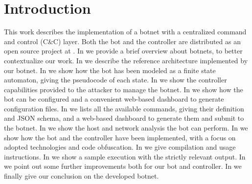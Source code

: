 \section{Introduction}
\label{sec:introduction}

This work describes the implementation of a botnet with a centralized command and control (C\&C) layer. Both the bot and the controller are distributed as an open source project at \cite{project-repo}.
In  we provide a brief overview about botnets, to better contextualize our work.
In  we describe the reference architecture implemented by our botnet.
In  we show how the bot has been modeled as a finite state automaton, giving the pseudocode of each state.
In  we show the controller capabilities provided to the attacker to manage the botnet.
In  we show how the bot can be configured and a convenient web-based dashboard to generate configuration files.
In  we lists all the available commands, giving their definition and JSON schema, and a web-based dashboard to generate them and submit to the botnet.
In  we show the host and network analysis the bot can perform.
In  we show how the bot and the controller have been implemented, with a focus on adopted technologies and code obfuscation.
In  we give compilation and usage instructions.
In  we show a sample execution with the strictly relevant output.
In  we point out some further improvements both for our bot and controller.
In  we finally give our conclusion on the developed botnet.
